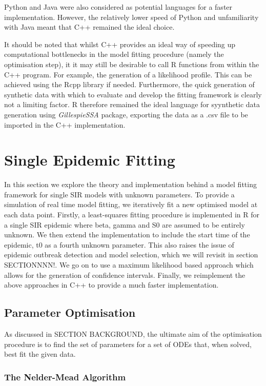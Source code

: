 \documentclass[11pt, a4paper, oneside,titlepage]{article}
\begin{document}
Python and Java were also considered as potential languages for a
faster implementation. However, the relatively lower speed of Python and
unfamiliarity with Java meant that C++ remained the ideal choice.

It should be noted that whilst C++ provides an ideal way of speeding
up computational bottlenecks in the model fitting procedure (namely
the optimisation step), it it may still be desirable to call R
functions from within the C++ program. For example, the generation of
a likelihood profile. This can be achieved using the
Rcpp library if needed. Furthermore, the quick generation of synthetic
data with which to evaluate and develop the fitting framework is
clearly not a limiting factor. R therefore remained the ideal language
for syynthetic data generation using \emph{GillespieSSA} package,
exporting the data as a .csv file to be imported in the C++ implementation. 

 
 
\newpage
\section{Single Epidemic Fitting}
In this section we explore the theory and implementation behind a
model fitting framework for single SIR models with unknown
parameters. To provide a simulation of real time model fitting, we
iteratively fit a new optimised model at each data point. Firstly, a
least-squares fitting procedure is implemented in R for a single SIR
epidemic where beta, gamma and S0 are assumed to be entirely
unknown. We then extend the implementation to include the start time
of the epidemic, t0 as a fourth unknown parameter. This also raises
the issue of epidemic outbreak detection and model selection, which we
will revisit in section SECTIONNNN!. We go on to use a maximum
likelihood based approach which allows for the generation of
confidence intervals. Finally, we reimplement the above approaches in
C++ to provide a much faster implementation.



\subsection{Parameter Optimisation}
As discussed in SECTION BACKGROUND, the ultimate aim of the
optimisation procedure is to find the set of parameters for a set of
ODEs that, when solved, best fit the given data. 

\subsubsection{The Nelder-Mead Algorithm}
\end{document}
